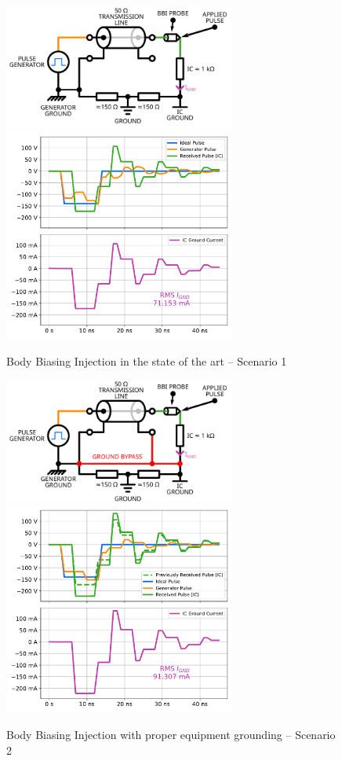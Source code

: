 \documentclass[10pt, conference, compsocconf]{IEEEtran}
\begin{document}
\label{subsection:simpleXP}
\begin{figure}
\centering
\includegraphics[width=3in]{model0Probe}
\includegraphics[width=3in]{SIMPLE_BBI_0.pdf}
\caption{Body Biasing Injection in the state of the art – Scenario 1}
\label{simpleModel0}
\end{figure}


\begin{figure}[hbtp]
\centering
\includegraphics[width=3in]{model1Probe}
\includegraphics[width=3in]{SIMPLE_BBI_1.pdf}
\caption{Body Biasing Injection with proper equipment grounding – Scenario 2}
\label{simpleModel1}
\end{figure}
\end{document}
